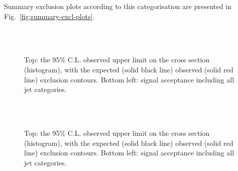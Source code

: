 Summary exclusion plots according to this categorisation are presented in
Fig.~\ref{fig:summary-excl-plots}.

\newpage
\begin{figure}[h!]
    \begin{center}
         \\
         ~~
        \caption{Top: the 95\% C.L. observed upper limit on the cross section
            (histogram), with the expected (solid black line) observed
            (solid red line) exclusion contours. Bottom left: signal acceptance
            including all jet categories.}
        \label{fig:T1bbbb}
    \end{center}
\end{figure}

\newpage
\begin{figure}[h!]
    \begin{center}
         \\
         ~~
        \caption{Top: the 95\% C.L. observed upper limit on the cross section
            (histogram), with the expected (solid black line) observed
            (solid red line) exclusion contours. Bottom left: signal acceptance
            including all jet categories.}
        \label{fig:T2tt}
    \end{center}
\end{figure}

